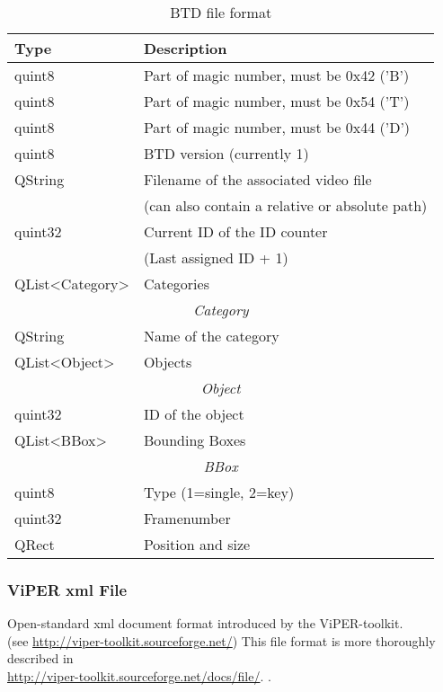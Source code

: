       \begin{table}[h]
         \centering
         \caption{BTD file format}
         \begin{tabular}{|l|l|}
            \hline
            \textbf{Type} & \textbf{Description} \\
            \hline\hline
            quint8 & Part of magic number, must be 0x42 ('B') \\
            \hline
            quint8 & Part of magic number, must be 0x54 ('T') \\
            \hline
            quint8 & Part of magic number, must be 0x44 ('D') \\
            \hline
            quint8 & BTD version (currently 1) \\
            \hline
            QString & Filename of the associated video file \\
                    & (can also contain a relative or absolute path) \\
            \hline
            quint32 & Current ID of the ID counter \\
                    & (Last assigned ID + 1) \\
            \hline
            QList<Category> & Categories \\
            \hline \hline
            \multicolumn{2}{|c|}{\textit{Category}} \\
            \hline
            QString & Name of the category \\
            \hline
            QList<Object> & Objects \\
            \hline \hline
            \multicolumn{2}{|c|}{\textit{Object}} \\
            \hline
            quint32 & ID of the object \\
            \hline
            QList<BBox> & Bounding Boxes \\
            \hline \hline
            \multicolumn{2}{|c|}{\textit{BBox}} \\
            \hline
            quint8 & Type (1=single, 2=key) \\
            \hline
            quint32 & Framenumber \\
            \hline
            QRect & Position and size \\
            \hline
         \end{tabular}
         \label{tab:btdformat}
      \end{table}
  \subsubsection{ViPER xml File} 
Open-standard xml document format introduced by the ViPER-toolkit.\\
(see \href{http://viper-toolkit.sourceforge.net/}{http://viper-toolkit.sourceforge.net/}) This file format is more thoroughly described in\\
 \href{http://viper-toolkit.sourceforge.net/docs/file/}{http://viper-toolkit.sourceforge.net/docs/file/}.
.

